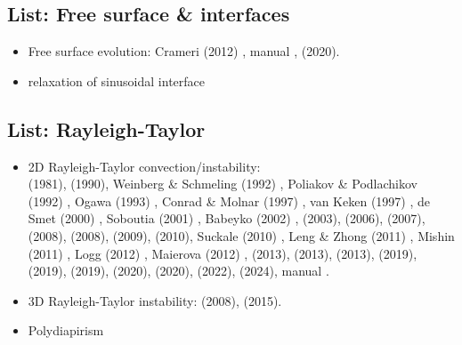 \subsection{List: Free surface \& interfaces}

\begin{itemize}

\item Free surface evolution: Crameri \etal (2012) \cite{crsg12}, 
      \aspect{} manual \cite{aspectmanual}, \textcite{sctc20} (2020).

\item relaxation of sinusoidal interface \cite{crsg12,robh17}

\end{itemize}


\subsection{List: Rayleigh-Taylor}

\begin{itemize}
\item 2D Rayleigh-Taylor convection/instability:\\ 
      \textcite{pros81} (1981),
      \textcite{trab90} (1990),
      Weinberg \& Schmeling (1992) \cite{wesc92},
      Poliakov \& Podlachikov (1992) \cite{popo92},
      Ogawa (1993) \cite{ogaw93},
      Conrad \& Molnar (1997) \cite{como97},
      van Keken \etal (1997) \cite{vaks97},
      de Smet \etal (2000) \cite{devv00a},
      Soboutia \etal (2001) \cite{soga01},
      Babeyko \etal (2002) \cite{bast02},
      \textcite{taki03} (2003),
      \textcite{bomh06} (2006),
      \textcite{dadh07} (2007),
      \textcite{basd08} (2008),
      \textcite{deka08} (2008),
      \textcite{qurj09} (2009),
      \textcite{saev10} (2010),
      Suckale \etal (2010) \cite{sunh10},
      Leng \& Zhong (2011) \cite{lezh11},
      Mishin (2011) \cite{mishin11}, 
      Logg \etal (2012) \cite{lomw12}, 
      Maierova (2012) \cite{maie12},
      \textcite{fusc13} (2013), 
      \textcite{vyrc13} (2013), 
      \textcite{chtl13} (2013),
      \textcite{ropu19} (2019),
      \textcite{robe19} (2019), 
      \textcite{demh19} (2019),
      \textcite{logb20} (2020),
      \textcite{sctc20} (2020),
      \textcite{mivg22} (2022),
      \textcite{buoa24} (2024),
      \aspect manual \cite{aspectmanual}.

\item 3D Rayleigh-Taylor instability:
      \textcite{fukk08} (2008),
      \textcite{vosc15} (2015).

\item Polydiapirism \cite{wesc92,aspectmanual}

\end{itemize}

